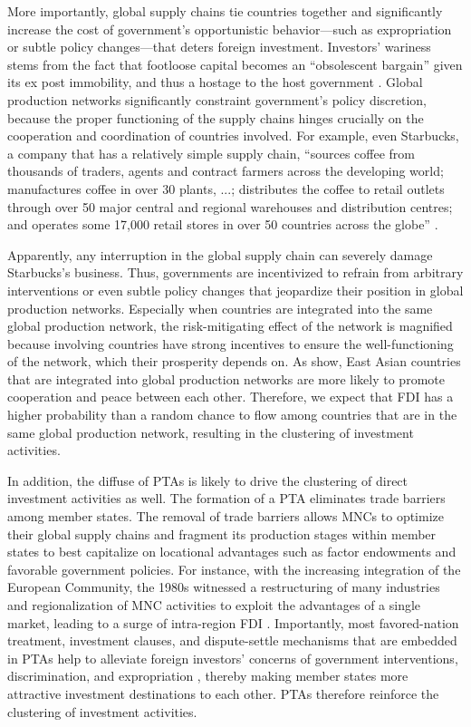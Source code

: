\documentclass[12pt]{article}
\begin{document}
More importantly, global supply chains tie countries together and significantly increase the cost of government's opportunistic behavior---such as expropriation or subtle policy changes---that deters foreign investment. Investors' wariness stems from the fact that footloose capital becomes an ``obsolescent bargain'' given its ex post immobility, and thus a hostage to the host government \citep{Vernon:1971,Vernon:1980}. Global production networks significantly constraint government's policy discretion, because the proper functioning of the supply chains hinges crucially on the cooperation and coordination of countries involved. For example, even Starbucks, a company that has a relatively simple supply chain, ``sources coffee from thousands of traders, agents and contract farmers across the developing world; manufactures coffee in over 30 plants, ...; distributes the coffee to retail outlets through over 50 major central and regional warehouses and distribution centres; and operates some 17,000 retail stores in over 50 countries across the globe'' \citep[142]{UNCTAD:2013}.

Apparently, any interruption in the global supply chain can severely damage Starbucks's business. Thus, governments are incentivized to refrain from arbitrary interventions or even subtle policy changes that jeopardize their position in global production networks. Especially when countries are integrated into the same global production network, the risk-mitigating effect of the network is magnified because involving countries have strong incentives to ensure the well-functioning of the network, which their prosperity depends on. As \citet{Kim_Solingen:2017} show, East Asian countries that are integrated into global production networks are more likely to promote cooperation and peace between each other. Therefore, we expect that FDI has a higher probability than a random chance to flow among countries that are in the same global production network, resulting in the clustering of investment activities.

In addition, the diffuse of PTAs is likely to drive the clustering of direct investment activities as well. The formation of a PTA eliminates trade barriers among member states. The removal of trade barriers allows MNCs to optimize their global supply chains and fragment its production stages within member states to best capitalize on locational advantages such as factor endowments and favorable government policies. For instance, with the increasing integration of the European Community, the 1980s witnessed a restructuring of many industries and regionalization of MNC activities to exploit the advantages of a single market, leading to a surge of intra-region FDI \citep[34]{UNCTAD:1991}. Importantly, most favored-nation treatment, investment clauses, and dispute-settle mechanisms that are embedded in PTAs help to alleviate foreign investors' concerns of government interventions, discrimination, and expropriation \citep{Buthe_Milner:2008,buthe2014foreign}, thereby making member states more attractive investment destinations to each other. PTAs therefore reinforce the clustering of investment activities.
\end{document}
